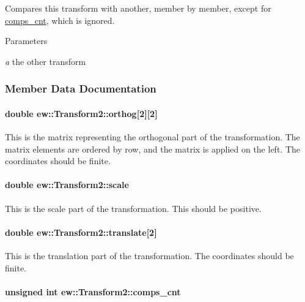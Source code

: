 \label{classew_1_1Transform2_a48c2ef88a4858220a25fc9ca24b38c99}
Compares this transform with another, member by member, except for \hyperlink{classew_1_1Transform2_a4fafd08e5f15d46f675237f2ff2adc2c}{comps\_\-cnt}, which is ignored. 
\begin{DoxyParams}{Parameters}
\item[{\em a}]the other transform \end{DoxyParams}


\subsubsection{Member Data Documentation}
\hypertarget{classew_1_1Transform2_a5f6c8c35d5086112e08355556dae6cea}{
\paragraph[{orthog}]{\setlength{\rightskip}{0pt plus 5cm}double {\bf ew::Transform2::orthog}\mbox{[}2\mbox{]}\mbox{[}2\mbox{]}}\hfill}
\label{classew_1_1Transform2_a5f6c8c35d5086112e08355556dae6cea}
This is the matrix representing the orthogonal part of the transformation. The matrix elements are ordered by row, and the matrix is applied on the left. The coordinates should be finite. \hypertarget{classew_1_1Transform2_a952c5d038168129b6625286f1c93bf07}{
\paragraph[{scale}]{\setlength{\rightskip}{0pt plus 5cm}double {\bf ew::Transform2::scale}}\hfill}
\label{classew_1_1Transform2_a952c5d038168129b6625286f1c93bf07}
This is the scale part of the transformation. This should be positive. \hypertarget{classew_1_1Transform2_ad8c8ca688c6d08508e8ee482606b7184}{
\paragraph[{translate}]{\setlength{\rightskip}{0pt plus 5cm}double {\bf ew::Transform2::translate}\mbox{[}2\mbox{]}}\hfill}
\label{classew_1_1Transform2_ad8c8ca688c6d08508e8ee482606b7184}
This is the translation part of the transformation. The coordinates should be finite. \hypertarget{classew_1_1Transform2_a4fafd08e5f15d46f675237f2ff2adc2c}{
\paragraph[{comps\_\-cnt}]{\setlength{\rightskip}{0pt plus 5cm}unsigned int {\bf ew::Transform2::comps\_\-cnt}}\hfill}

